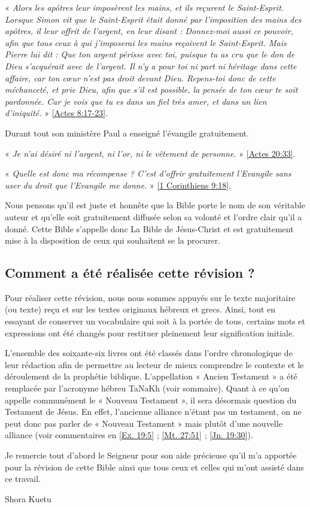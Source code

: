 « \emph{Alors les apôtres leur imposèrent les mains, et ils reçurent le Saint-Esprit. Lorsque Simon vit que le Saint-Esprit était donné par l'imposition des mains des apôtres, il leur offrit de l'argent, en leur disant : Donnez-moi aussi ce pouvoir, afin que tous ceux à qui j'imposerai les mains reçoivent le Saint-Esprit. Mais Pierre lui dit : Que ton argent périsse avec toi, puisque tu as cru que le don de Dieu s'acquérait avec de l'argent. Il n'y a pour toi ni part ni héritage dans cette affaire, car ton cœur n'est pas droit devant Dieu. Repens-toi donc de cette méchanceté, et prie Dieu, afin que s'il est possible, la pensée de ton cœur te soit pardonnée. Car je vois que tu es dans un fiel très amer, et dans un lien d'iniquité.} » \vref{Actes 8:17-23}.

Durant tout son ministère Paul a enseigné l'évangile gratuitement.

« \emph{Je n'ai désiré ni l'argent, ni l'or, ni le vêtement de personne.} » \vref{Actes 20:33}.

« \emph{Quelle est donc ma récompense ? C'est d'offrir gratuitement l'Evangile sans user du droit que l'Evangile me donne.} » \vref{1 Corinthiens 9:18}.

Nous pensons qu'il est juste et honnête que la Bible porte le nom de son véritable auteur et qu'elle soit gratuitement diffusée selon sa volonté et l'ordre clair qu'il a donné. Cette Bible s'appelle donc La Bible de Jésus-Christ et est gratuitement mise à la disposition de ceux qui souhaitent se la procurer. 

\subsection*{Comment a été réalisée cette révision ?}

Pour réaliser cette révision, nous nous sommes appuyés sur le texte majoritaire (ou texte) reçu et sur les textes originaux hébreux et grecs. Ainsi, tout en essayant de conserver un vocabulaire qui soit à la portée de tous, certains mots et expressions ont été changés pour restituer pleinement leur signification initiale.

L'ensemble des soixante-six livres ont été classés dans l'ordre chronologique de leur rédaction afin de permettre au lecteur de mieux comprendre le contexte et le déroulement de la prophétie biblique. L'appellation « Ancien Testament » a été remplacée par l'acronyme hébreu TaNaKh (voir sommaire). Quant à ce qu'on appelle communément le « Nouveau Testament », il sera désormais question du Testament de Jésus. En effet, l'ancienne alliance n'étant pas un testament, on ne peut donc pas parler de « Nouveau Testament » mais plutôt d'une nouvelle alliance (voir commentaires en \vref{Ex. 19:5} ; \vref{Mt. 27:51} ; \vref{Jn. 19:30}).

Je remercie tout d'abord le Seigneur pour son aide précieuse qu'il m'a apportée pour la révision de cette Bible ainsi que tous ceux et celles qui m'ont assisté dans ce travail.

Shora Kuetu
